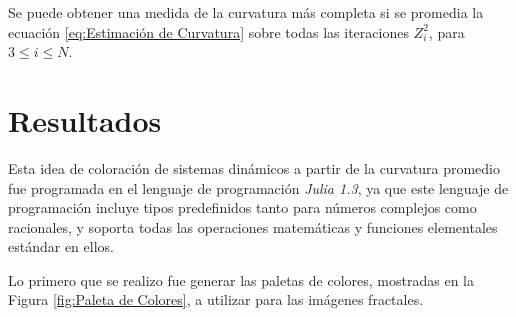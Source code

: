\documentclass[12pt,letterpaper,final]{article}
\theoremstyle{plain}
\theoremstyle{definition}
\theoremstyle{remark}
\numberwithin{equation}{section}
\begin{document}
Se puede obtener una medida de la curvatura más completa si se promedia la ecuación \ref{eq:Estimación de Curvatura} sobre todas las iteraciones $Z_{i}^{2}$, para $3 \leq i \leq N$.

\section{Resultados}
Esta idea de coloración de sistemas dinámicos a partir de la curvatura promedio fue programada en el lenguaje de programación \textit{Julia 1.3}, ya que este lenguaje de programación incluye tipos predefinidos tanto para números complejos como racionales, y soporta todas las operaciones matemáticas y funciones elementales estándar en ellos.

Lo primero que se realizo fue generar las paletas de colores, mostradas en la Figura \ref{fig:Paleta de Colores}, a utilizar para las imágenes fractales.
\end{document}
